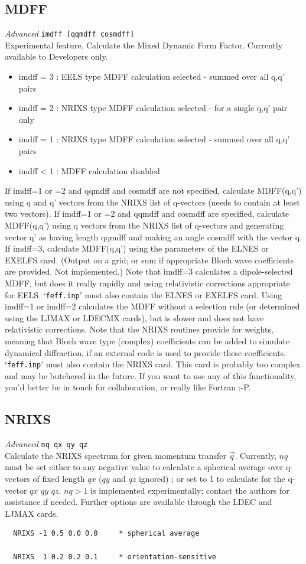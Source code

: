 \documentclass[11pt,oneside]{report} %
\renewcommand{\htmlref}[2]{\hyperlink{#2}{#1}}
\newenvironment{Card}[4]%
      {\vspace{3ex}%
        \subsection{#1}
        \quad\textsl{#3}\newline
        \quad\texttt{#2}\newline%
        \label{card:#4}\\}
      {}
\newcommand{\file}[1]{`\texttt{#1}'}
\renewcommand{\htmlref}[2]{{#1}} %
\begin{document}
\begin{Card}{MDFF}{imdff [qqmdff cosmdff]}{Advanced}{mdf}
 Experimental feature.  Calculate the Mixed Dynamic Form Factor.  Currently available to Developers only. 
\begin{itemize}   \tightlist
\item			   imdff = 3 : EELS type MDFF calculation selected - summed over all q,q' pairs
\item			   imdff = 2 : NRIXS type MDFF calculation selected - for a single q,q' pair only
\item			   imdff = 1 : NRIXS type MDFF calculation selected - summed over all q,q' pairs
\item  			   imdff < 1 : MDFF calculation disabled
\end{itemize}
 If imdff=1 or =2 and qqmdff and cosmdff are not specified, calculate MDFF(q,q') using q and q' vectors from the NRIXS list of q-vectors (needs to contain at least two vectors).
 If imdff=1 or =2 and qqmdff and cosmdff are specified, calculate MDFF(q,q') using q vectors from the NRIXS list of q-vectors and generating vector q' as having length qqmdff and making an angle cosmdff with the vector q.
 If imdff=3, calculate MDFF(q,q') using the parameters of the ELNES or EXELFS card.  (Output on a grid; or sum if appropriate Bloch wave coefficients are provided.  Not implemented.)
 Note that imdff=3 calculates a dipole-selected MDFF, but does it really rapidly and using relativistic corrections appropriate for EELS.  \file{feff.inp} must also contain the ELNES or EXELFS card.
 Using imdff=1 or imdff=2 calculates the MDFF without a selection rule (or determined using the LJMAX or LDECMX cards), but is slower and does not have relativistic corrections.  Note that the NRIXS routines provide for weights, meaning that Bloch wave type (complex) coefficients can be added to simulate dynamical diffraction, if an external code is used to provide these coefficients.  \file{feff.inp} must also contain the NRIXS card.
 This card is probably too complex and may be butchered in the future.  If you want to use any of this functionality, you'd better be in touch for collaboration, or really like Fortran :-P.
 \end{Card}

\begin{Card}{NRIXS}{nq qx qy qz}{Advanced}{nri}
  Calculate the NRIXS spectrum for given momentum transfer $\vec{q}$.  Currently, $nq$ must be set either to any negative value to calculate
  a spherical average over q-vectors of fixed length $qx$ ($qy$ and $qz$ ignored) ; or set to 1 to calculate
  for the q-vector $qx$ $qy$ $qz$.   $nq > 1$ is implemented experimentally; contact the authors for assistance if needed.  Further options are available through the
  \htmlref{LDEC}{card:lde} and \htmlref{LJMAX}{card:ljm} cards.
\begin{verbatim}
  NRIXS -1 0.5 0.0 0.0     * spherical average
  
  NRIXS  1 0.2 0.2 0.1     * orientation-sensitive 
\end{verbatim}
\end{Card}
\end{document}
